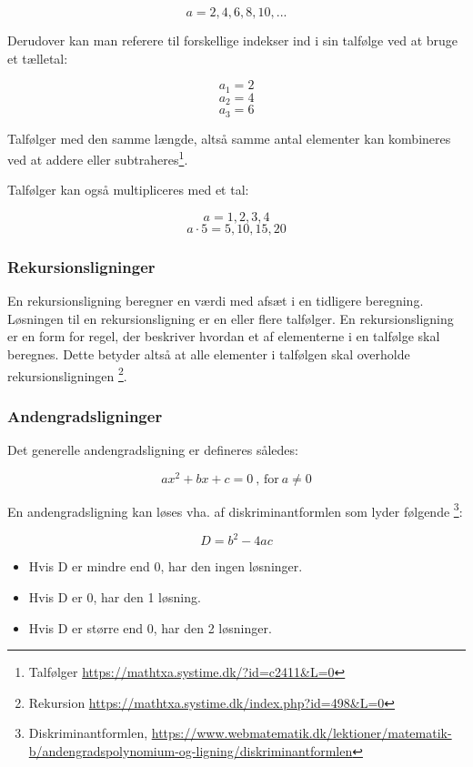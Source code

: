 \documentclass{article}
\begin{document}
\begin{flushleft}
    \[{a} = {2, 4, 6, 8, 10, ...}\]

    Derudover kan man referere til forskellige indekser ind i sin talfølge ved at bruge et tælletal:

    \[a_1 = 2\]
    \[a_2 = 4\]
    \[a_3 = 6\]

    Talfølger med den samme længde, altså samme antal elementer
    kan kombineres ved at addere eller subtraheres\footnote{Talfølger \url{https://mathtxa.systime.dk/?id=c2411&L=0}}.

    Talfølger kan også multipliceres med et tal:

    \[{a} = {1, 2, 3, 4}\]
    \[{a} \cdot 5 = {5, 10, 15, 20}\]

    \subsubsection{Rekursionsligninger}

    En rekursionsligning beregner en værdi med afsæt i en tidligere beregning.
    Løsningen til en rekursionsligning er en eller flere talfølger.
    En rekursionsligning er en form for regel, der beskriver hvordan et af elementerne i en talfølge skal beregnes.
    Dette betyder altså at alle elementer i talfølgen skal overholde rekursionsligningen
    \footnote{Rekursion \url{https://mathtxa.systime.dk/index.php?id=498&L=0}}.

    \subsubsection{Andengradsligninger}

    Det generelle andengradsligning er defineres således:

    \[ ax^2+bx+c = 0 \ \textrm{, for} \ a \neq 0\]

    En andengradsligning kan løses vha. af diskriminantformlen som lyder følgende
    \footnote{Diskriminantformlen, \url{https://www.webmatematik.dk/lektioner/matematik-b/andengradspolynomium-og-ligning/diskriminantformlen}}:

    \[D=b^2-4ac\]

    \begin{itemize}
        \item Hvis D er mindre end 0, har den ingen løsninger.
        \item Hvis D er 0, har den 1 løsning.
        \item Hvis D er større end 0, har den 2 løsninger.
    \end{itemize}


\end{flushleft}
\end{document}

